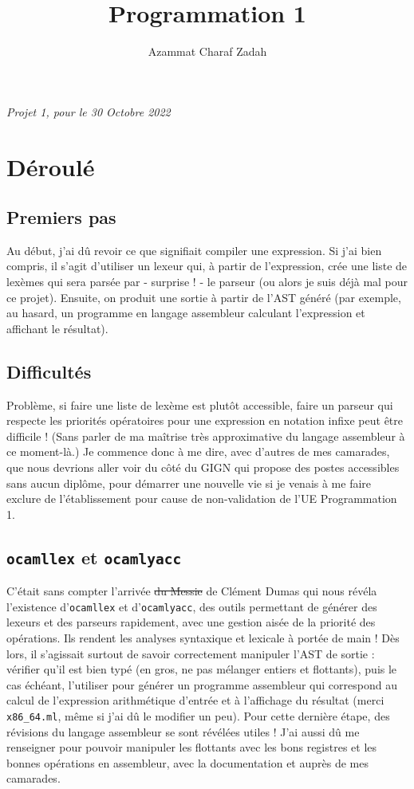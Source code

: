 \documentclass[12pt,french]{article}
\title{Programmation 1}
\author{Azammat Charaf Zadah}
\date{}
\date{}
\begin{document}
\maketitle
\begin{center}
    \textit{Projet 1, pour le 30 Octobre 2022}
\end{center}

\section{Déroulé}
\subsection{Premiers pas}
Au début, j'ai dû revoir ce que signifiait compiler une expression. Si j'ai bien compris, il s'agit d'utiliser un lexeur qui, à partir de l'expression, crée une liste de lexèmes qui sera parsée par - surprise ! - le parseur (ou alors je suis déjà mal pour ce projet). Ensuite, on produit une sortie à partir de l'AST généré (par exemple, au hasard, un programme en langage assembleur calculant l'expression et affichant le résultat).
\subsection{Difficultés}
Problème, si faire une liste de lexème est plutôt accessible, faire un parseur qui respecte les priorités opératoires pour une expression en notation infixe peut être difficile ! (Sans parler de ma maîtrise très approximative du langage assembleur à ce moment-là.) Je commence donc à me dire, avec d'autres de mes camarades, que nous devrions aller voir du côté du GIGN qui propose des postes accessibles sans aucun diplôme, pour démarrer une nouvelle vie si je venais à me faire exclure de l'établissement pour cause de non-validation de l'UE Programmation 1.
\subsection{\texttt{ocamllex} et \texttt{ocamlyacc}}
C'était sans compter l'arrivée \sout{du Messie} de Clément Dumas qui nous révéla l'existence d'\texttt{ocamllex} et d'\texttt{ocamlyacc}, des outils permettant de générer des lexeurs et des parseurs rapidement, avec une gestion aisée de la priorité des opérations. Ils rendent les analyses syntaxique et lexicale à portée de main ! Dès lors, il s'agissait surtout de savoir correctement manipuler l'AST de sortie : vérifier qu'il est bien typé (en gros, ne pas mélanger entiers et flottants), puis le cas échéant, l'utiliser pour générer un programme assembleur qui correspond au calcul de l'expression arithmétique d'entrée et à l'affichage du résultat (merci \texttt{x86\_64.ml}, même si j'ai dû le modifier un peu). Pour cette dernière étape, des révisions du langage assembleur se sont révélées utiles ! J'ai aussi dû me renseigner pour pouvoir manipuler les flottants avec les bons registres et les bonnes opérations en assembleur, avec la documentation et auprès de mes camarades.
\newpage
\end{document}
